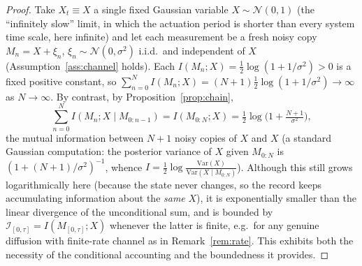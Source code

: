 \documentclass{amsart}
\theoremstyle{definition}
\theoremstyle{remark}
\begin{document}
\begin{proof}
Take $X_t\equiv X$ a single fixed Gaussian variable
$X\sim\mathcal N(0,1)$ (the ``infinitely slow'' limit, in which the
actuation period is shorter than every system time scale, here
infinite) and let each measurement be a fresh noisy copy
$M_n=X+\xi_n$, $\xi_n\sim\mathcal N(0,\sigma^2)$ i.i.d.\ and independent
of $X$ (Assumption~\ref{ass:channel} holds). Each
$I(M_n;X)=\tfrac12\log(1+1/\sigma^2)>0$ is a fixed positive constant, so
$\sum_{n=0}^N I(M_n;X)=(N+1)\tfrac12\log(1+1/\sigma^2)\to\infty$ as
$N\to\infty$. By contrast, by Proposition~\ref{prop:chain},
\[
\sum_{n=0}^N I(M_n;X\mid M_{0:n-1})=I(M_{0:N};X)
=\tfrac12\log\!\Big(1+\tfrac{N+1}{\sigma^2}\Big),
\]
the mutual information between $N+1$ noisy copies of $X$ and $X$ (a
standard Gaussian computation: the posterior variance of $X$ given
$M_{0:N}$ is $(1+(N+1)/\sigma^2)^{-1}$, whence
$I=\tfrac12\log\frac{\mathrm{Var}(X)}{\mathrm{Var}(X\mid
M_{0:N})}$). Although this still grows logarithmically here (because the
state never changes, so the record keeps accumulating information about
the \emph{same} $X$), it is exponentially smaller than the linear
divergence of the unconditional sum, and is bounded by
$\mathcal I_{[0,\tau]}=I(M_{[0,\tau]};X)$ whenever the latter is finite,
e.g.\ for any genuine diffusion with finite-rate channel as in
Remark~\ref{rem:rate}. This exhibits both the necessity of the
conditional accounting and the boundedness it provides.
\end{proof}
\end{document}
